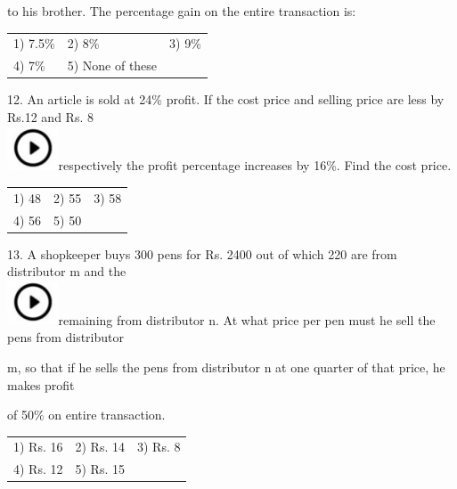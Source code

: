 \documentclass{article} %
\begin{document}
\noindent to his brother. The percentage gain on the entire transaction is:

\noindent 

\noindent 
\begin{tabular}{p{1.7in} p{1.6in} p{1.6in}} \\ 
	1) 7.5\%                   &  2) 8\%                &  3) 9\%                \\
4) 7\%                & 5) None of these  \\
\end{tabular}

\noindent 

12. An article is sold at 24\% profit. If the cost price and selling price are less by Rs.12 and Rs. 8  
\noindent \\ \includegraphics*[width=0.60in, height=0.52in]{images/image1}respectively the profit percentage increases by 16\%. Find the cost price.

\noindent 
\begin{tabular}{p{1.7in} p{1.6in} p{1.6in}} \\ 
	1) 48                        &  2) 55                 &  3) 58                 \\
4) 56                 & 5) 50 \\
\end{tabular}

\noindent 

13. A shopkeeper buys 300 pens for Rs. 2400 out of which 220 are from distributor m and the  
\noindent \\ \includegraphics*[width=0.60in, height=0.52in]{images/image1}remaining from distributor n. At what price per pen must he sell the pens from distributor

\noindent m, so that if he sells the pens from distributor n at one quarter of that price, he makes profit

\noindent 

\noindent of 50\% on entire transaction.

\noindent 

\noindent 
\begin{tabular}{p{1.7in} p{1.6in} p{1.6in}} \\ 
	1) Rs. 16                 &  2) Rs. 14           &  3) Rs. 8             \\
4) Rs. 12           & 5) Rs. 15 \\
\end{tabular}
\end{document}
